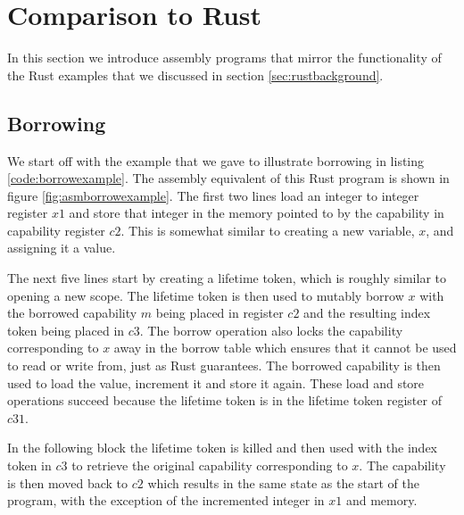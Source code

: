 \section{Comparison to Rust}
In this section we introduce assembly programs that mirror the functionality of the Rust examples that we discussed in section \ref{sec:rustbackground}.
\subsection{Borrowing}
We start off with the example that we gave to illustrate borrowing in listing \ref{code:borrowexample}.
The assembly equivalent of this Rust program is shown in figure \ref{fig:asmborrowexample}.
The first two lines load an integer to integer register $x1$ and store that integer in the memory pointed to by the capability in capability register $c2$.
This is somewhat similar to creating a new variable, $x$, and assigning it a value.

The next five lines start by creating a lifetime token, which is roughly similar to opening a new scope.
The lifetime token is then used to mutably borrow $x$ with the borrowed capability $m$ being placed in register $c2$ and the resulting index token being placed in $c3$.
The borrow operation also locks the capability corresponding to $x$ away in the borrow table which ensures that it cannot be used to read or write from, just as Rust guarantees.
The borrowed capability is then used to load the value, increment it and store it again.
These load and store operations succeed because the lifetime token is in the lifetime token register of $c31$.

In the following block the lifetime token is killed and then used with the index token in $c3$ to retrieve the original capability corresponding to $x$.
The capability is then moved back to $c2$ which results in the same state as the start of the program, with the exception of the incremented integer in $x1$ and memory.

